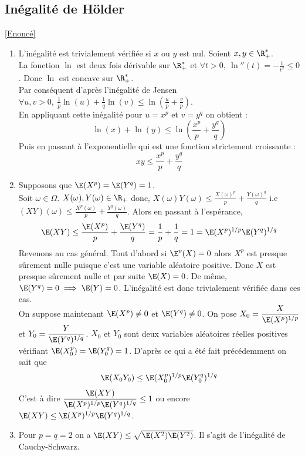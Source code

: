 \documentclass[8pt]{book}
\begin{document}
	\subsection{Inégalité de Hölder }
	\label{Inégalité de Hölder corrigé}
		\textcolor{blue}{\hyperref[Inégalité de Hölder]{[Enoncé]}}\\
	\begin{enumerate}[leftmargin=*]
		\item L'inégalité est trivialement vérifiée si $x$ ou $y$ est nul. Soient $x,y\in \R^*_+$.\\
		La fonction $\ln$ est deux fois dérivable sur $\R^*_+$ et $\forall t>0,\ \ln''(t)=\displaystyle-\frac{1}{t^2}\leq 0$. Donc $\ln$ est concave sur $\R^*_+$.\\
		Par conséquent d'après l'inégalité de Jensen $\forall u,v>0,\ \displaystyle\frac{1}{p}\ln(u)+\frac{1}{q}\ln(v)\leq \ln\left(\frac{u}{p}+\frac{v}{p}\right)$.\\
		En appliquant cette inégalité pour $u=x^p$ et $v=y^q$ on obtient :
		$$\ln(x)+\ln(y)\leq \ln\left(\frac{x^p}{p}+\frac{y^q}{q}\right)$$
		Puis en passant à l'exponentielle qui est une fonction strictement croissante :
		$$xy\leq \frac{x^p}{p}+\frac{y^q}{q}$$
		\item Supposons que $\E(X^p)=\E(Y^q)=1$.\\
		Soit $\omega\in \Omega$. $X(\omega),Y(\omega)\in \R_+$ donc, $X(\omega)Y(\omega)\leq \displaystyle\frac{X(\omega)^p}{p}+\frac{Y(\omega)^q}{q}$ i.e $(XY)(\omega)\leq \displaystyle\frac{X^p(\omega)}{p}+\frac{Y^q(\omega)}{q}$. Alors en passant à l'espérance,
		$$\E(XY)\leq \frac{\E(X^p)}{p}+\frac{\E(Y^q)}{q}=\frac{1}{p}+\frac{1}{q}=1=\E(X^p)^{1/p}\E(Y^q)^{1/q}$$
		Revenons au cas général. Tout d'abord si $\E^p(X)=0$ alors $X^p$ est presque sûrement nulle puisque c'est une variable aléatoire positive. Donc $X$ est presque sûrement nulle et par suite $\E(X)=0$. De même, $\E(Y^q)=0\implies \E(Y)=0$. L'inégalité est donc trivialement vérifiée dans ces cas.\\
		On suppose maintenant $\E(X^p)\ne 0$ et $\E(Y^q)\ne 0$. On pose $X_0=\displaystyle\frac{X}{\E(X^p)^{1/p}}$ et $Y_0=\displaystyle\frac{Y}{\E(Y^q)^{1/q}}$. $X_0$ et $Y_0$ sont deux variables aléatoires réelles positives vérifiant $\E(X_0^p)=\E(Y_0^q)=1$. D'après ce qui a été fait précédemment on sait que
		$$\E(X_0Y_0)\leq \E(X_0^p)^{1/p}\E(Y_0^q)^{1/q}$$
		C'est à dire $\displaystyle\frac{\E(XY)}{\E(X^p)^{1/p}\E(Y^q)^{1/q}}\leq 1$ ou encore $\E(XY)\leq \E(X^p)^{1/p}\E(Y^q)^{1/q}$.
		\item Pour $p=q=2$ on a $\E(XY)\leq \sqrt{\E(X^2)\E(Y^2)}$. Il s'agit de l'inégalité de Cauchy-Schwarz.
	\end{enumerate}
	
\end{document}
